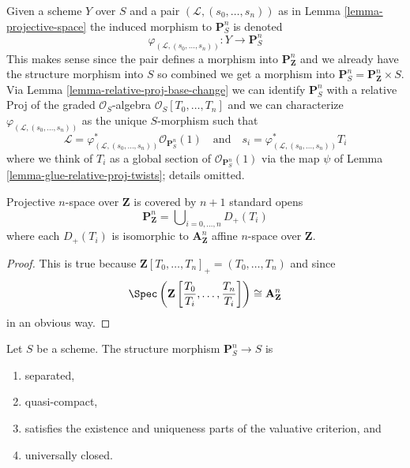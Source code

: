 \noindent
Given a scheme $Y$ over $S$
and a pair $(\mathcal{L}, (s_0, \ldots, s_n))$ as in
Lemma \ref{lemma-projective-space}
the induced morphism to $\mathbf{P}^n_S$ is denoted
$$
\varphi_{(\mathcal{L}, (s_0, \ldots, s_n))} :
Y \longrightarrow \mathbf{P}^n_S
$$
This makes sense since the pair defines a morphism into
$\mathbf{P}^n_{\mathbf{Z}}$ and we already have the structure
morphism into $S$ so combined we get a morphism into
$\mathbf{P}^n_S = \mathbf{P}^n_{\mathbf{Z}} \times S$.
Via Lemma \ref{lemma-relative-proj-base-change}
we can identify $\mathbf{P}^n_S$ with a relative Proj of
the graded $\mathcal{O}_S$-algebra $\mathcal{O}_S[T_0, \ldots, T_n]$
and we can characterize $\varphi_{(\mathcal{L}, (s_0, \ldots, s_n))}$
as the unique $S$-morphism such that
$$
\mathcal{L} =
\varphi_{(\mathcal{L}, (s_0, \ldots, s_n))}^*\mathcal{O}_{\mathbf{P}^n_S}(1)
\quad
\text{and}
\quad
s_i = \varphi_{(\mathcal{L}, (s_0, \ldots, s_n))}^*T_i
$$
where we think of $T_i$ as a global section of
$\mathcal{O}_{\mathbf{P}^n_S}(1)$ via the map $\psi$ of
Lemma \ref{lemma-glue-relative-proj-twists}; details omitted.

\begin{lemma}
\label{lemma-standard-covering-projective-space}
Projective $n$-space over $\mathbf{Z}$ is covered by
$n + 1$ standard opens
$$
\mathbf{P}^n_{\mathbf{Z}} =
\bigcup\nolimits_{i = 0, \ldots, n} D_{+}(T_i)
$$
where each $D_{+}(T_i)$ is isomorphic to $\mathbf{A}^n_{\mathbf{Z}}$
affine $n$-space over $\mathbf{Z}$.
\end{lemma}

\begin{proof}
This is true because
$\mathbf{Z}[T_0, \ldots, T_n]_{+} = (T_0, \ldots, T_n)$ and
since
$$
\Spec
\left(
\mathbf{Z}
\left[\frac{T_0}{T_i}, \ldots, \frac{T_n}{T_i}
\right]
\right)
\cong
\mathbf{A}^n_{\mathbf{Z}}
$$
in an obvious way.
\end{proof}

\begin{lemma}
\label{lemma-projective-space-separated}
Let $S$ be a scheme.
The structure morphism $\mathbf{P}^n_S \to S$ is
\begin{enumerate}
\item separated,
\item quasi-compact,
\item satisfies the existence and uniqueness parts of the valuative criterion,
and
\item universally closed.
\end{enumerate}
\end{lemma}

